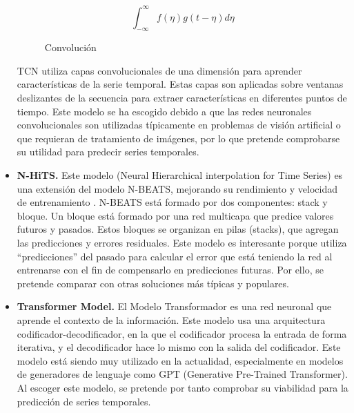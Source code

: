 \begin{itemize}
        \begin{figure}[h]
            \[\int_{-\infty}^{\infty}f(\eta)g(t - \eta)d\eta\]
            \caption{Convolución}
            \label{conv}
        \end{figure}

        TCN utiliza capas convolucionales de una dimensión para aprender características de la serie temporal. Estas 
        capas son aplicadas sobre ventanas deslizantes de la secuencia para extraer características en diferentes puntos 
        de tiempo.
        Este modelo se ha escogido debido a que las redes neuronales convolucionales son utilizadas típicamente en 
        problemas de visión artificial o que requieran de tratamiento de imágenes, por lo que pretende comprobarse 
        su utilidad para predecir series temporales.
    \item \textbf{N-HiTS.} Este modelo (Neural Hierarchical interpolation for Time Series) es una extensión del modelo 
        N-BEATS, mejorando su rendimiento y velocidad de entrenamiento \cite{DBLP:journals/corr/abs-2201-12886}. N-BEATS \cite{Oreshkin2020N-BEATS:}
        está formado por dos componentes: stack y bloque. Un bloque está formado por una red multicapa que predice 
        valores futuros y pasados. Estos bloques se organizan en pilas (stacks), que agregan las predicciones y errores 
        residuales. 
        Este modelo es interesante porque utiliza ``predicciones'' del pasado para calcular el error que está teniendo 
        la red al entrenarse con el fin de compensarlo en predicciones futuras. Por ello, se pretende comparar con otras 
        soluciones más típicas y populares.
    \item \textbf{Transformer Model.} El Modelo Transformador \cite{DBLP:journals/corr/VaswaniSPUJGKP17} es una red 
        neuronal que aprende el contexto de la información. Este modelo usa una arquitectura codificador-decodificador,
        en la que el codificador procesa la entrada de forma iterativa, y el decodificador hace lo mismo con la salida del 
        codificador.
        Este modelo está siendo muy utilizado en la actualidad, especialmente en modelos de generadores de lenguaje como 
        GPT (Generative Pre-Trained Transformer). Al escoger este modelo, se pretende por tanto comprobar su viabilidad 
        para la predicción de series temporales.
\end{itemize}

